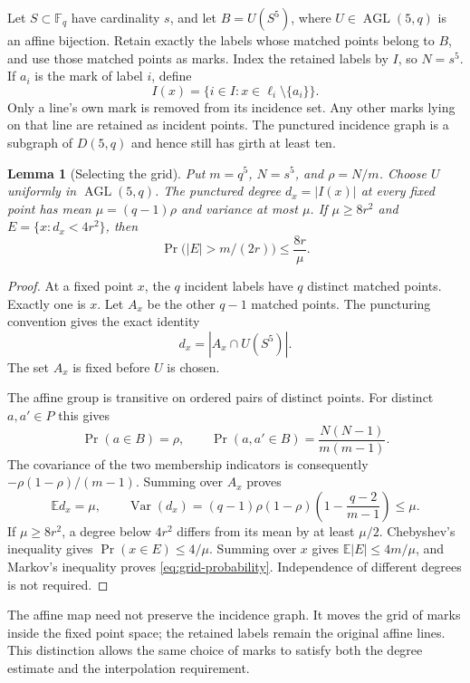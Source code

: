 \documentclass[11pt]{amsart}
\newtheorem{lemma}[theorem]{Lemma}
\theoremstyle{definition}
\theoremstyle{remark}
\numberwithin{equation}{section}
\newcommand{\F}{\mathbb F}
\DeclareMathOperator{\AGL}{AGL}
\begin{document}
Let $S\subset\F_q$ have cardinality $s$, and let
$B=U(S^5)$, where $U\in\AGL(5,q)$ is an affine bijection. Retain
exactly the labels whose matched points belong to $B$, and use those
matched points as marks. Index the retained labels by $I$, so
$N=s^5$. If $a_i$ is the mark of label $i$, define
\[
 I(x)=\{i\in I:x\in\ell_i\setminus\{a_i\}\}.
\]
Only a line's own mark is removed from its incidence set. Any other
marks lying on that line are retained as incident points. The
punctured incidence graph is a subgraph of $D(5,q)$ and hence still
has girth at least ten.

\begin{lemma}[Selecting the grid]\label{lem:grid}
Put $m=q^5$, $N=s^5$, and $\rho=N/m$. Choose $U$ uniformly in
$\AGL(5,q)$. The punctured degree $d_x=|I(x)|$ at every fixed point
has mean $\mu=(q-1)\rho$ and variance at most $\mu$.
If $\mu\ge8r^2$ and $E=\{x:d_x<4r^2\}$, then
\begin{equation}\label{eq:grid-probability}
 \Pr\bigl(|E|>m/(2r)\bigr)\le\frac{8r}{\mu}.
\end{equation}
\end{lemma}

\begin{proof}
At a fixed point $x$, the $q$ incident labels have $q$ distinct
matched points. Exactly one is $x$. Let $A_x$ be the other $q-1$
matched points. The puncturing convention gives the exact identity
\[
 d_x=|A_x\cap U(S^5)|.
\]
The set $A_x$ is fixed before $U$ is chosen.

The affine group is transitive on ordered pairs of distinct points.
For distinct $a,a'\in P$ this gives
\[
 \Pr(a\in B)=\rho,\qquad
 \Pr(a,a'\in B)=\frac{N(N-1)}{m(m-1)}.
\]
The covariance of the two membership indicators is consequently
$-\rho(1-\rho)/(m-1)$. Summing over $A_x$ proves
\[
 \mathbb E d_x=\mu,\qquad
 \operatorname{Var}(d_x)
 =(q-1)\rho(1-\rho)\left(1-\frac{q-2}{m-1}\right)\le\mu.
\]
If $\mu\ge8r^2$, a degree below $4r^2$ differs from its mean by
at least $\mu/2$. Chebyshev's inequality gives
$\Pr(x\in E)\le4/\mu$. Summing over $x$ gives
$\mathbb E|E|\le4m/\mu$, and Markov's inequality proves
\eqref{eq:grid-probability}. Independence of different degrees is
not required.
\end{proof}

The affine map need not preserve the incidence graph. It moves the
grid of marks inside the fixed point space; the retained labels
remain the original affine lines. This distinction allows the same
choice of marks to satisfy both the degree estimate and the
interpolation requirement.
\end{document}
